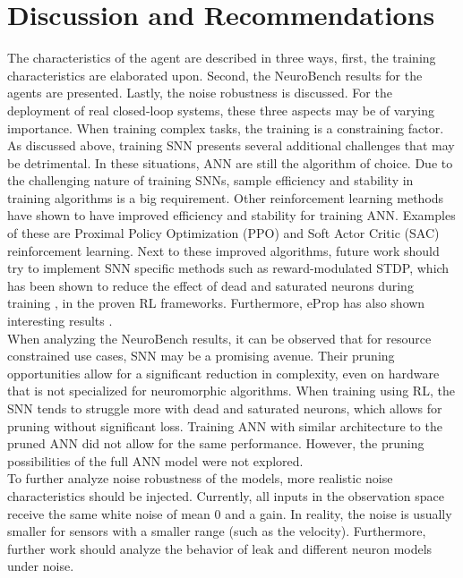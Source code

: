 \section{Discussion and Recommendations}
\label{section:recs}
The characteristics of the agent are described in three ways, first, the training characteristics are elaborated upon. Second, the NeuroBench results for the agents are presented. Lastly, the noise robustness is discussed. For the deployment of real closed-loop systems, these three aspects may be of varying importance. When training complex tasks, the training is a constraining factor. As discussed above, training SNN presents several additional challenges that may be detrimental. In these situations, ANN are still the algorithm of choice. Due to the challenging nature of training SNNs, sample efficiency and stability in training algorithms is a big requirement. Other reinforcement learning methods have shown to have improved efficiency and stability for training ANN. Examples of these are Proximal Policy Optimization (PPO) and Soft Actor Critic (SAC) reinforcement learning. Next to these improved algorithms, future work should try to implement SNN specific methods such as reward-modulated STDP, which has been shown to reduce the effect of dead and saturated neurons during training \cite{florian_reinforcement_2005}, in the proven RL frameworks. Furthermore, eProp has also shown interesting results \cite{eProp_pong}. 
\\
When analyzing the NeuroBench results, it can be observed that for resource constrained use cases, SNN may be a promising avenue. Their pruning opportunities allow for a significant reduction in complexity, even on hardware that is not specialized for neuromorphic algorithms. When training using RL, the SNN tends to struggle more with dead and saturated neurons, which allows for pruning without significant loss. Training ANN with similar architecture to the pruned ANN did not allow for the same performance. However, the pruning possibilities of the full ANN model were not explored. \\ 
To further analyze noise robustness of the models, more realistic noise characteristics should be injected. Currently, all inputs in the observation space receive the same white noise of mean 0 and a gain. In reality, the noise is usually smaller for sensors with a smaller range (such as the velocity). Furthermore, further work should analyze the behavior of leak and different neuron models under noise. 